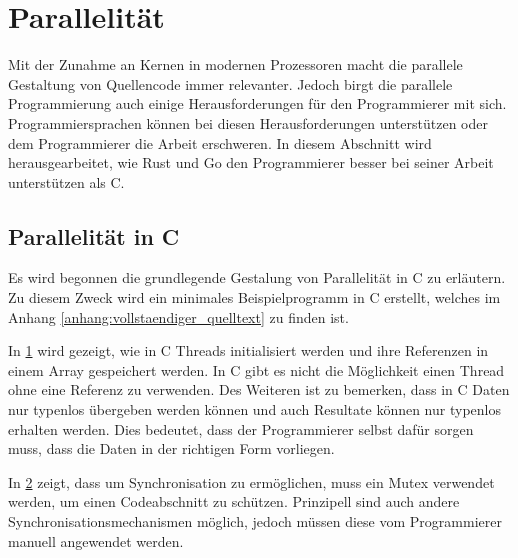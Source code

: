 \section{Parallelität}
\label{sec:Parallelität}

Mit der Zunahme an Kernen in modernen Prozessoren macht die parallele Gestaltung 
von Quellencode immer relevanter. Jedoch birgt die parallele Programmierung
auch einige Herausforderungen für den Programmierer mit sich. Programmiersprachen
können bei diesen Herausforderungen unterstützen oder dem Programmierer die Arbeit
erschweren. In diesem Abschnitt wird herausgearbeitet, wie Rust und Go den
Programmierer besser bei seiner Arbeit unterstützen als C.

\subsection{Parallelität in C}
\label{subsec:Parallelität in C}

Es wird begonnen die grundlegende Gestalung von Parallelität in C zu erläutern.
Zu diesem Zweck wird ein minimales Beispielprogramm in C erstellt, welches im 
Anhang \ref{anhang:vollstaendiger_quelltext} zu finden ist. 

In \cref{fig:datentyp_in_c} wird gezeigt, wie in C Threads initialisiert werden
und ihre Referenzen in einem Array gespeichert werden. In C gibt es nicht die 
Möglichkeit einen Thread ohne eine Referenz zu verwenden. Des Weiteren ist zu 
bemerken, dass in C Daten nur typenlos übergeben werden können und auch Resultate
können nur typenlos erhalten werden. Dies bedeutet, dass der Programmierer
selbst dafür sorgen muss, dass die Daten in der richtigen Form vorliegen. 
\autocite{hawthorneLanguageComparisonParallel}

\begin{figure}[htp]
    \centering
    
    \label{fig:datentyp_in_c}
\end{figure}

In \cref{fig:mutex_in_c} zeigt, dass um Synchronisation zu ermöglichen, muss
ein Mutex verwendet werden, um einen Codeabschnitt zu schützen. Prinzipell sind 
auch andere Synchronisationsmechanismen möglich, jedoch müssen diese vom 
Programmierer manuell angewendet werden. 

\begin{figure}[htp]
    \centering
    
    \label{fig:mutex_in_c}
\end{figure}


